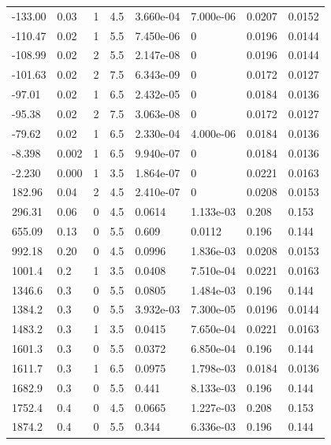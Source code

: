 \documentclass[preview]{standalone}
\begin{document}
{{\begin{tabular}{L{1.2cm}C{1.2cm} C{0.3cm}C{0.5cm} C{1.4cm}C{1.4cm} C{1.4cm}C{1.4cm}}
  -133.00  &  0.03  & 1     & 4.5 &  3.660e-04  & 7.000e-06  & 0.0207 &  0.0152   \\ 
  -110.47  &  0.02  & 1     & 5.5 &  7.450e-06  & 0  & 0.0196 &  0.0144   \\ 
  -108.99  &  0.02  & 2     & 5.5 &  2.147e-08  & 0  & 0.0196 &  0.0144   \\ 
  -101.63  &  0.02  & 2     & 7.5 &  6.343e-09  & 0  & 0.0172 &  0.0127   \\ 
  -97.01  &  0.02  & 1     & 6.5 &  2.432e-05  & 0  & 0.0184 &  0.0136   \\ 
  -95.38  &  0.02  & 2     & 7.5 &  3.063e-08  & 0  & 0.0172 &  0.0127   \\ 
  -79.62  &  0.02  & 1     & 6.5 &  2.330e-04  & 4.000e-06  & 0.0184 &  0.0136   \\ 
  -8.398  &  0.002  & 1     & 6.5 &  9.940e-07  & 0  & 0.0184 &  0.0136   \\ 
  -2.230  &  0.000  & 1     & 3.5 &  1.864e-07  & 0  & 0.0221 &  0.0163   \\ 
  182.96  &  0.04  & 2     & 4.5 &  2.410e-07  & 0  & 0.0208 &  0.0153   \\ 
  296.31  &  0.06  & 0     & 4.5 &  0.0614  & 1.133e-03  & 0.208 &  0.153   \\ 
  655.09  &  0.13  & 0     & 5.5 &  0.609  & 0.0112  & 0.196 &  0.144   \\ 
  992.18  &  0.20  & 0     & 4.5 &  0.0996  & 1.836e-03  & 0.0208 &  0.0153   \\ 
  1001.4  &   0.2  & 1     & 3.5 &  0.0408  & 7.510e-04  & 0.0221 &  0.0163   \\ 
  1346.6  &   0.3  & 0     & 5.5 &  0.0805  & 1.484e-03  & 0.196 &  0.144   \\ 
  1384.2  &   0.3  & 0     & 5.5 &  3.932e-03  & 7.300e-05  & 0.0196 &  0.0144   \\ 
  1483.2  &   0.3  & 1     & 3.5 &  0.0415  & 7.650e-04  & 0.0221 &  0.0163   \\ 
  1601.3  &   0.3  & 0     & 5.5 &  0.0372  & 6.850e-04  & 0.196 &  0.144   \\ 
  1611.7  &   0.3  & 1     & 6.5 &  0.0975  & 1.798e-03  & 0.0184 &  0.0136   \\ 
  1682.9  &   0.3  & 0     & 5.5 &  0.441  & 8.133e-03  & 0.196 &  0.144   \\ 
  1752.4  &   0.4  & 0     & 4.5 &  0.0665  & 1.227e-03  & 0.208 &  0.153   \\ 
  1874.2  &   0.4  & 0     & 5.5 &  0.344  & 6.336e-03  & 0.196 &  0.144   \\ 

\end{tabular}}}
\end{document}
